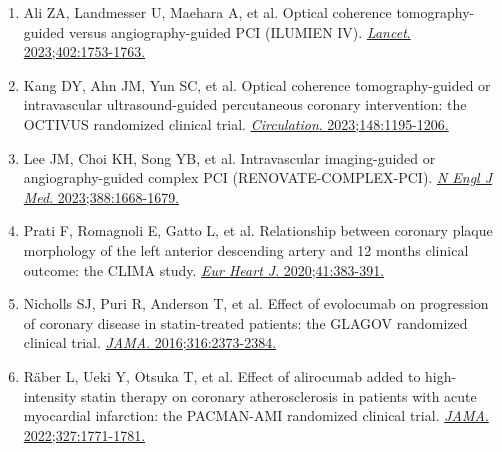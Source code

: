 \documentclass[12pt,a4paper]{article}
\begin{document}
\begin{enumerate}
    \item Ali ZA, Landmesser U, Maehara A, et al. Optical coherence tomography-guided versus angiography-guided PCI (ILUMIEN IV). \href{https://doi.org/10.1016/S0140-6736(23)02266-6}{\textit{Lancet}. 2023;402:1753-1763.}

    \item Kang DY, Ahn JM, Yun SC, et al. Optical coherence tomography-guided or intravascular ultrasound-guided percutaneous coronary intervention: the OCTIVUS randomized clinical trial. \href{https://doi.org/10.1161/CIRCULATIONAHA.122.062534}{\textit{Circulation}. 2023;148:1195-1206.}

    \item Lee JM, Choi KH, Song YB, et al. Intravascular imaging-guided or angiography-guided complex PCI (RENOVATE-COMPLEX-PCI). \href{https://doi.org/10.1056/NEJMoa2216607}{\textit{N Engl J Med}. 2023;388:1668-1679.}

    \item Prati F, Romagnoli E, Gatto L, et al. Relationship between coronary plaque morphology of the left anterior descending artery and 12 months clinical outcome: the CLIMA study. \href{https://doi.org/10.1093/eurheartj/ehz693}{\textit{Eur Heart J}. 2020;41:383-391.}

    \item Nicholls SJ, Puri R, Anderson T, et al. Effect of evolocumab on progression of coronary disease in statin-treated patients: the GLAGOV randomized clinical trial. \href{https://doi.org/10.1001/jama.2016.16951}{\textit{JAMA}. 2016;316:2373-2384.}

    \item Räber L, Ueki Y, Otsuka T, et al. Effect of alirocumab added to high-intensity statin therapy on coronary atherosclerosis in patients with acute myocardial infarction: the PACMAN-AMI randomized clinical trial. \href{https://doi.org/10.1001/jama.2022.5218}{\textit{JAMA}. 2022;327:1771-1781.}
\end{enumerate}
\end{document}
